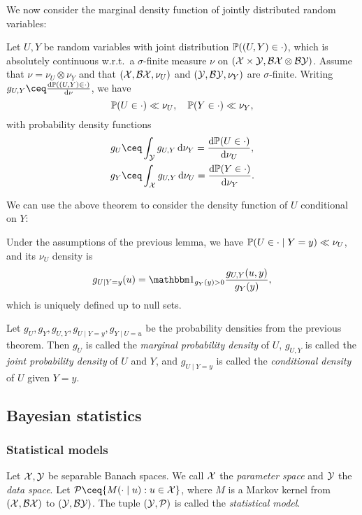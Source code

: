 We now consider the marginal density function of jointly distributed random variables:
\begin{lemma}
	Let $U, Y$ be random variables with joint distribution $\mathbb P((U, Y) \in \cdot)$, which is absolutely continuous w.r.t.\ a $\sigma$-finite measure $\nu$ on $(\mathcal X \times\mathcal Y, \mathcal B\mathcal X \otimes \mathcal B\mathcal Y)$. Assume that $\nu = \nu_U \otimes \nu_Y$ and that $(\mathcal X, \mathcal B\mathcal X, \nu_U)$ and $(\mathcal Y, \mathcal B\mathcal Y, \nu_Y)$ are $\sigma$-finite. Writing $g_{U, Y} \ceq \frac{\dd \PP((U, Y) \in \cdot)}{\dd\nu}$, we have
	\[
	\mathbb P(U \in \cdot) \ll \nu_U, \quad \mathbb P(Y \in \cdot) \ll \nu_Y, 
	\]
	with probability density functions
	\begin{align*}
		g_U &\ceq \int_\YY g_{U, Y} \dd{\nu_Y} = \frac{\dd \PP(U \in \cdot)}{\dd \nu_U}, \\
		g_Y &\ceq \int_\XX g_{U, Y} \dd{\nu_U} = \frac{\dd \PP(Y \in \cdot)}{\dd \nu_Y}.
	\end{align*}
\end{lemma}

We can use the above theorem to consider the density function of $U$ conditional on $Y$:
\begin{theorem}\label{thm:conditional_density}
	Under the assumptions of the previous lemma, we have $\mathbb P(U \in \cdot \mid Y = y) \ll \nu_U$, and its $\nu_U$ density is
	\[
	g_{U \mid Y = y}(u) = \ind_{g_Y(y) > 0}  \frac{g_{U, Y}(u, y)}{g_Y(y)},
	\]
	which is uniquely defined up to null sets. 
\end{theorem}

\begin{definition}
	Let $g_U, g_Y, g_{U, Y}, g_{U\mid Y= y}, g_{Y \mid U = u}$ be the probability densities from the previous theorem. Then $g_U$ is called the \emph{marginal probability density} of $U$, $g_{U, Y}$ is called the \emph{joint probability density} of $U$ and $Y$, and $g_{U \mid Y = y}$ is called the \emph{conditional density} of $U$ given $Y = y$.  
\end{definition}

\subsection{Bayesian statistics}
\subsubsection{Statistical models}
\begin{definition}
	Let $\mathcal X, \mathcal Y$ be separable Banach spaces. We call $\mathcal X$ the \emph{parameter space} and $\mathcal Y$ the \emph{data space}. Let $\Pp \ceq \qty{M(\cdot \mid u) : u \in \XX}$, where $M$ is a Markov kernel from $(\mathcal X, \mathcal B\mathcal X)$ to $(\mathcal Y, \mathcal B\mathcal Y)$. The tuple $(\mathcal Y, \mathcal P)$ is called the \emph{statistical model}. 
\end{definition}


